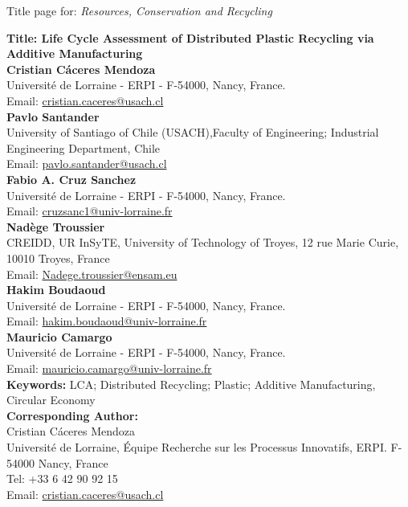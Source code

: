 \begin{titlepage}
\begin{center}
		Title page for: \large\textit{Resources, Conservation and Recycling} \\
\end{center}
		\Large\textbf{Title: Life Cycle Assessment of Distributed Plastic Recycling via Additive Manufacturing}\\

\normalsize\textbf{Cristian Cáceres Mendoza}\\
Université de Lorraine - ERPI -  F-54000, Nancy, France.\\
Email: \url{cristian.caceres@usach.cl}\\


\normalsize\textbf{Pavlo Santander}\\
University of Santiago of Chile (USACH),Faculty of Engineering; Industrial Engineering Department, Chile\\
Email: \url{pavlo.santander@usach.cl}\\

\textbf{Fabio A. Cruz Sanchez}\\
Université de Lorraine - ERPI -  F-54000, Nancy, France.\\
Email: \url{cruzsanc1@univ-lorraine.fr}\\

\textbf{Nadège Troussier}\\
CREIDD, UR InSyTE, University of Technology of Troyes, 12 rue Marie Curie, 10010 Troyes, France\\
Email: \url{Nadege.troussier@ensam.eu}\\


\textbf{Hakim Boudaoud}\\
Université de Lorraine - ERPI -  F-54000, Nancy, France.\\
Email: \url{hakim.boudaoud@univ-lorraine.fr}\\

\textbf{Mauricio Camargo}\\
Université de Lorraine - ERPI -  F-54000, Nancy, France.\\
Email: \url{mauricio.camargo@univ-lorraine.fr}\\[2mm]


\textbf{Keywords:} LCA; Distributed Recycling; Plastic; Additive Manufacturing, Circular Economy\\


\textbf{Corresponding Author:}\\
Cristian Cáceres Mendoza \\
Université de Lorraine, Équipe Recherche sur les Processus Innovatifs, ERPI. F-54000 Nancy, France \\
Tel: +33 6 42 90 92 15 \\
Email: \url{cristian.caceres@usach.cl}\\[3mm]



\vfill
\end{titlepage}

